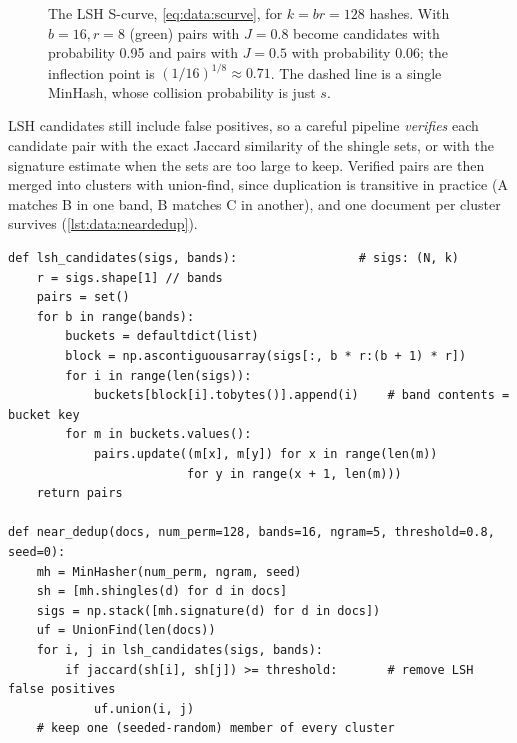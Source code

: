 \begin{figure}[t]
\centering
{}
\caption{The LSH S-curve, \cref{eq:data:scurve}, for $k=br=128$ hashes. With $b=16, r=8$
(green) pairs with $J=0.8$ become candidates with probability 0.95 and pairs with $J=0.5$ with
probability 0.06; the inflection point is $(1/16)^{1/8}\approx0.71$. The dashed line is a single
MinHash, whose collision probability is just $s$.}
\label{fig:data:scurve}
\end{figure}

LSH candidates still include false positives, so a careful pipeline \emph{verifies} each candidate
pair with the exact Jaccard similarity of the shingle sets, or with the signature estimate when the sets are
too large to keep. Verified pairs are then merged into clusters with union-find, since duplication
is transitive in practice (A matches B in one band, B matches C in another), and one document per
cluster survives (\cref{lst:data:neardedup}).

\begin{lstlisting}[caption={LSH candidates, verification and clustering (abridged from \code{llmsys/datapipe/dedup.py}).},label={lst:data:neardedup}]
def lsh_candidates(sigs, bands):                 # sigs: (N, k)
    r = sigs.shape[1] // bands
    pairs = set()
    for b in range(bands):
        buckets = defaultdict(list)
        block = np.ascontiguousarray(sigs[:, b * r:(b + 1) * r])
        for i in range(len(sigs)):
            buckets[block[i].tobytes()].append(i)    # band contents = bucket key
        for m in buckets.values():
            pairs.update((m[x], m[y]) for x in range(len(m))
                         for y in range(x + 1, len(m)))
    return pairs

def near_dedup(docs, num_perm=128, bands=16, ngram=5, threshold=0.8, seed=0):
    mh = MinHasher(num_perm, ngram, seed)
    sh = [mh.shingles(d) for d in docs]
    sigs = np.stack([mh.signature(d) for d in docs])
    uf = UnionFind(len(docs))
    for i, j in lsh_candidates(sigs, bands):
        if jaccard(sh[i], sh[j]) >= threshold:       # remove LSH false positives
            uf.union(i, j)
    # keep one (seeded-random) member of every cluster
\end{lstlisting}

